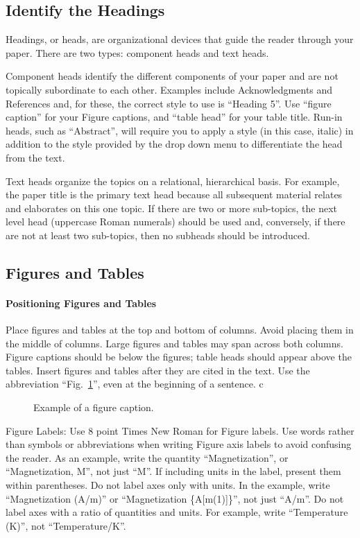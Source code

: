 \documentclass[conference]{IEEEtran}
\begin{document}
\subsection{Identify the Headings}
Headings, or heads, are organizational devices that guide the reader through 
your paper. There are two types: component heads and text heads.

Component heads identify the different components of your paper and are not 
topically subordinate to each other. Examples include Acknowledgments and 
References and, for these, the correct style to use is ``Heading 5''. Use 
``figure caption'' for your Figure captions, and ``table head'' for your 
table title. Run-in heads, such as ``Abstract'', will require you to apply a 
style (in this case, italic) in addition to the style provided by the drop 
down menu to differentiate the head from the text.

Text heads organize the topics on a relational, hierarchical basis. For 
example, the paper title is the primary text head because all subsequent 
material relates and elaborates on this one topic. If there are two or more 
sub-topics, the next level head (uppercase Roman numerals) should be used 
and, conversely, if there are not at least two sub-topics, then no subheads 
should be introduced.

\subsection{Figures and Tables}
\paragraph{Positioning Figures and Tables} Place figures and tables at the top and 
bottom of columns. Avoid placing them in the middle of columns. Large 
figures and tables may span across both columns. Figure captions should be 
below the figures; table heads should appear above the tables. Insert 
figures and tables after they are cited in the text. Use the abbreviation 
``Fig.~\ref{fig}'', even at the beginning of a sentence.
c
\begin{figure}[htbp]
\caption{Example of a figure caption.}
\label{fig}
\end{figure}

Figure Labels: Use 8 point Times New Roman for Figure labels. Use words 
rather than symbols or abbreviations when writing Figure axis labels to 
avoid confusing the reader. As an example, write the quantity 
``Magnetization'', or ``Magnetization, M'', not just ``M''. If including 
units in the label, present them within parentheses. Do not label axes only 
with units. In the example, write ``Magnetization (A/m)'' or ``Magnetization 
\{A[m(1)]\}'', not just ``A/m''. Do not label axes with a ratio of 
quantities and units. For example, write ``Temperature (K)'', not 
``Temperature/K''.
\end{document}
